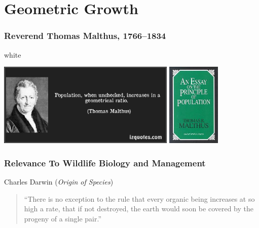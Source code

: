 \documentclass[color=usenames,dvipsnames]{beamer}\usepackage[]{graphicx}\usepackage[]{color}
\begin{document}
\section{Geometric Growth}








\begin{frame}
  \frametitle{Reverend Thomas Malthus, 1766--1834}
  \begin{beamercolorbox}[wd=\paperwidth]{white}
    \begin{center}
      \includegraphics[height=4cm,keepaspectratio]{figs/MalthusGeometric}
      \hspace{0.1cm}
      \includegraphics[height=4cm,keepaspectratio]{figs/MalthusBookCover}
    \end{center}
  \end{beamercolorbox}
\end{frame}


\begin{frame}
  \frametitle{\normalsize Relevance To Wildlife Biology and Management}
  Charles Darwin (\textit{Origin of Species})
  \begin{quote}
    ``There is no exception to the rule that every organic being
    increases at so high a rate, that if not destroyed, the earth
    would soon be covered by the progeny of a single pair.''
  \end{quote}
\end{frame}
\end{document}

